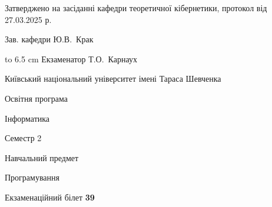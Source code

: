 \documentclass[12pt, ukrainian]{article}
\begin{document}
{\smallskip\smallskip \begin {scriptsize} Затверджено на засіданні кафедри теоретичної кібернетики, протокол   від   27.03.2025 р.\par\smallskip\smallskip\smallskip\smallskip
{\parbox {6.5 cm} {Зав. кафедри \dotfill Ю.В.~Крак}}\hspace {0.7cm} {\hbox to 6.5 cm { Екзаменатор \dotfill Т.О.~Карнаух}} \end{scriptsize}}
\newpage
{{\begin {scriptsize}\par
{ \center  Київський національний університет імені Тараса Шевченка \par}
{\parbox {5 cm}{Освітня програма \hfill}{\parbox {7 cm}{Інформатика\hfill}}\parbox {6 cm}{\hfill Семестр 2}}\par
{\parbox {5 cm} {Навчальний предмет \hfill}\parbox {7 cm}{Програмування \hfill}\parbox {6cm}{\hfill}\par}\vspace{-15pt} \end{scriptsize}}{\center Екзаменаційний білет \No \textbf { 39 }\par}}
\end{document}
